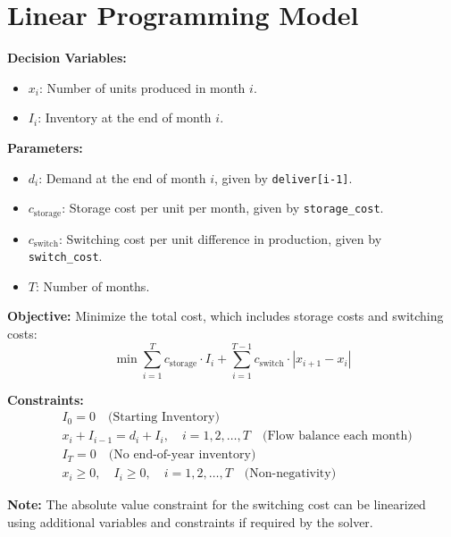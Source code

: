 \documentclass{article}
\begin{document}
\section*{Linear Programming Model}

\textbf{Decision Variables:}
\begin{itemize}
    \item $x_i$: Number of units produced in month $i$.
    \item $I_i$: Inventory at the end of month $i$.
\end{itemize}

\textbf{Parameters:}
\begin{itemize}
    \item $d_i$: Demand at the end of month $i$, given by \texttt{deliver[i-1]}.
    \item $c_{\text{storage}}$: Storage cost per unit per month, given by \texttt{storage\_cost}.
    \item $c_{\text{switch}}$: Switching cost per unit difference in production, given by \texttt{switch\_cost}.
    \item $T$: Number of months.
\end{itemize}

\textbf{Objective:}
Minimize the total cost, which includes storage costs and switching costs:
\[
\min \sum_{i=1}^{T} c_{\text{storage}} \cdot I_i + \sum_{i=1}^{T-1} c_{\text{switch}} \cdot |x_{i+1} - x_i|
\]

\textbf{Constraints:}
\begin{align*}
    & I_0 = 0 \quad \text{(Starting Inventory)} \\
    & x_i + I_{i-1} = d_i + I_i, \quad i = 1, 2, \ldots, T \quad \text{(Flow balance each month)} \\
    & I_T = 0 \quad \text{(No end-of-year inventory)} \\
    & x_i \geq 0, \quad I_i \geq 0, \quad i = 1, 2, \ldots, T \quad \text{(Non-negativity)}
\end{align*}

\textbf{Note:}
The absolute value constraint for the switching cost can be linearized using additional variables and constraints if required by the solver.
\end{document}
